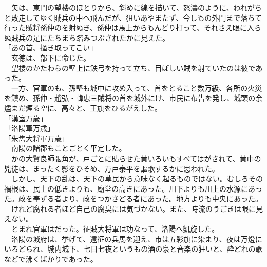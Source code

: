\documentclass[
  paper=a5,
  fontsize=10pt,
  jafontsize=9.5pt,
  tate,                  %
  open_bracket_pos=nibu, %
]{jlreq}
\begin{document}
　矢は、東門の望楼のほとりから、斜めに線を描いて、怒濤のように、われがちと敗走してゆく賊兵の中へ飛んだが、狙いあやまたず、今しもの外門まで落ちて行った賊将孫仲のを射ぬき、孫仲は馬上からもんどり打って、それさえ眼に入らぬ賊兵の足にたちまち踏みつぶされたかに見えた。\\


「あの首、掻き取ってこい」\\


　玄徳は、部下に命じた。\\


　望楼のかたわらの壁上に鉄弓を持って立ち、目ぼしい賊を射ていたのは彼であった。\\


　一方、官軍のも、孫堅も城中に攻め入って、首をとること数万級、各所の火災を鎮め、孫仲・趙弘・韓忠三賊将の首を城外にけ、市民に布告を発し、城頭の余燼まだ煙る空に、高々と、王旗をひるがえした。\\


「漢室万歳」\\


「洛陽軍万歳」\\


「朱雋大将軍万歳」\\


　南陽の諸郡もことごとく平定した。\\


　かの大賢良師張角が、戸ごとに貼らせた黄いろいもすべてはがされて、黄巾の兇徒は、まったく影をひそめ、万戸泰平を謳歌するかに思われた。\\


　しかし、天下の乱は、天下の草民から意味なく起るものではない。むしろその禍根は、民土の低きよりも、廟堂の高きにあった。川下よりも川上の水源にあった。政を奉ずる者より、政をつかさどる者にあった。地方よりも中央にあった。\\


　けれど腐れる者ほど自己の腐臭には気づかない。また、時流のうごきは眼に見えない。\\


　とまれ官軍はだった。征賊大将軍は功なって、洛陽へ凱旋した。\\


　洛陽の城府は、挙げて、遠征の兵馬を迎え、市は五彩旗に染まり、夜は万燈にいろどられ、城内城下、七日七夜というもの酒の泉と音楽の狂いと、酔どれの歌などで沸くばかりであった。\\
\end{document}
